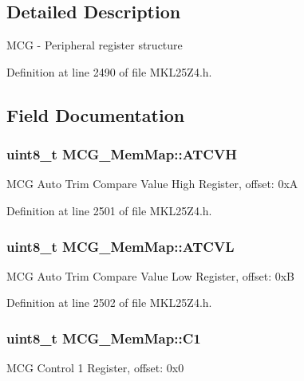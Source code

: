 \subsection{Detailed Description}
M\+CG -\/ Peripheral register structure 

Definition at line 2490 of file M\+K\+L25\+Z4.\+h.



\subsection{Field Documentation}
\subsubsection[{\texorpdfstring{A\+T\+C\+VH}{ATCVH}}]{\setlength{\rightskip}{0pt plus 5cm}uint8\+\_\+t M\+C\+G\+\_\+\+Mem\+Map\+::\+A\+T\+C\+VH}\hypertarget{struct_m_c_g___mem_map_a74fee35955b4ec57aa8058bd57a926a8}{}\label{struct_m_c_g___mem_map_a74fee35955b4ec57aa8058bd57a926a8}
M\+CG Auto Trim Compare Value High Register, offset\+: 0xA 

Definition at line 2501 of file M\+K\+L25\+Z4.\+h.

\subsubsection[{\texorpdfstring{A\+T\+C\+VL}{ATCVL}}]{\setlength{\rightskip}{0pt plus 5cm}uint8\+\_\+t M\+C\+G\+\_\+\+Mem\+Map\+::\+A\+T\+C\+VL}\hypertarget{struct_m_c_g___mem_map_a913b6fd7776c0377e299fdf0eeb166af}{}\label{struct_m_c_g___mem_map_a913b6fd7776c0377e299fdf0eeb166af}
M\+CG Auto Trim Compare Value Low Register, offset\+: 0xB 

Definition at line 2502 of file M\+K\+L25\+Z4.\+h.

\subsubsection[{\texorpdfstring{C1}{C1}}]{\setlength{\rightskip}{0pt plus 5cm}uint8\+\_\+t M\+C\+G\+\_\+\+Mem\+Map\+::\+C1}\hypertarget{struct_m_c_g___mem_map_a433a36d1aeb9d033b502ee263c1495a1}{}\label{struct_m_c_g___mem_map_a433a36d1aeb9d033b502ee263c1495a1}
M\+CG Control 1 Register, offset\+: 0x0 

